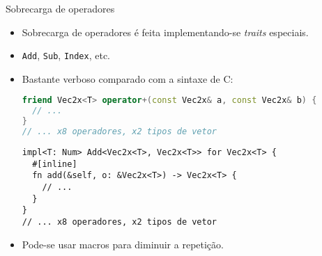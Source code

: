 \documentclass{beamer}
\def\Cpp{{C\nolinebreak[4]\raisebox{.2ex}{\scriptsize\bf++}}}
\begin{document}
\begin{frame}[fragile]{Sobrecarga de operadores}
	\begin{itemize}
		\item Sobrecarga de operadores é feita implementando-se \emph{traits} especiais.
		\item \texttt{Add}, \texttt{Sub}, \texttt{Index}, etc.
		\item Bastante verboso comparado com a sintaxe de \Cpp:
		\begin{lstlisting}[language=C++]
friend Vec2x<T> operator+(const Vec2x& a, const Vec2x& b) {
  // ...
}
// ... x8 operadores, x2 tipos de vetor
		\end{lstlisting}
		\begin{lstlisting}
impl<T: Num> Add<Vec2x<T>, Vec2x<T>> for Vec2x<T> {
  #[inline]
  fn add(&self, o: &Vec2x<T>) -> Vec2x<T> {
    // ...
  }
}
// ... x8 operadores, x2 tipos de vetor
		\end{lstlisting}
		\item Pode-se usar macros para diminuir a repetição.
	\end{itemize}
\end{frame}
\end{document}
